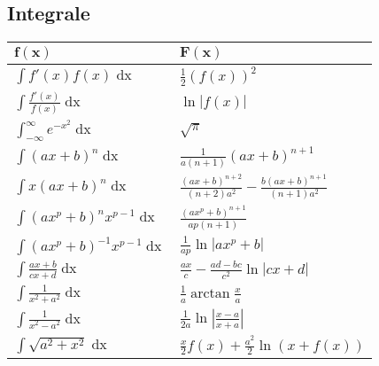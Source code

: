 \documentclass[a4paper,10pt]{article}
\renewcommand*{\arraystretch}{2}
\begin{document}
\subsection{Integrale}
\begin{center}
	\begin{tabularx}{\linewidth}{>{\centering\arraybackslash}X>{\centering\arraybackslash}X}
		\toprule
		$\mathbf{f(x)}$                      & $\mathbf{F(x)}$                                                  \\
		\midrule
		$\int f'(x) f(x) \mathop{dx}$                & $\frac{1}{2}(f(x))^2$                                            \\
		$\int \frac{f'(x)}{f(x)} \mathop{dx}$        & $\ln|f(x)|$                                                      \\
		$\int_{-\infty}^\infty e^{-x^2} \mathop{dx}$ & $\sqrt{\pi}$                                                     \\
		$\int (ax+b)^n \mathop{dx}$                  & $\frac{1}{a(n+1)}(ax+b)^{n+1}$                                   \\
		$\int x(ax+b)^n \mathop{dx}$                 & $\frac{(ax+b)^{n+2}}{(n+2)a^2} - \frac{b(ax+b)^{n+1}}{(n+1)a^2}$ \\
		$\int (ax^p+b)^n x^{p-1} \mathop{dx}$        & $\frac{(ax^p+b)^{n+1}}{ap(n+1)}$                                 \\
		$\int (ax^p + b)^{-1} x^{p-1} \mathop{dx}$   & $\frac{1}{ap} \ln |ax^p + b|$                                    \\
		$\int \frac{ax+b}{cx+d} \mathop{dx}$         & $\frac{ax}{c} - \frac{ad-bc}{c^2} \ln |cx +d|$                   \\
		$\int \frac{1}{x^2+a^2} \mathop{dx}$         & $\frac{1}{a} \arctan \frac{x}{a}$                                \\
		$\int \frac{1}{x^2 - a^2} \mathop{dx}$       & $\frac{1}{2a} \ln\left| \frac{x-a}{x+a} \right|$                 \\
		$\int \sqrt{a^2+x^2} \mathop{dx} $           & $\frac{x}{2}f(x) + \frac{a^2}{2}\ln(x+f(x))$                     \\
		\bottomrule
	\end{tabularx}
\end{center}
\clearpage

\renewcommand*{\arraystretch}{2.5}
\end{document}
